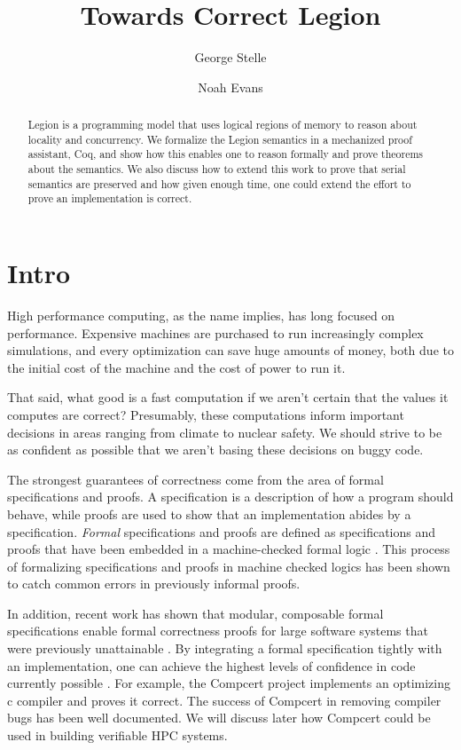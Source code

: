 \documentclass[sigplan]{acmart}
\begin{document}
\title{Towards Correct Legion}
\author{George Stelle}

\author{Noah Evans}

\begin{abstract}
Legion is a programming model that uses logical regions of memory to reason about 
locality and concurrency. We formalize the Legion semantics in a mechanized
proof assistant, Coq, and show how this enables one to reason formally and
prove theorems about the semantics. We also discuss how to extend this work to
prove that serial semantics are preserved and how given enough time, one could
extend the effort to prove an implementation is correct.
\end{abstract}

\maketitle

\section{Intro}
High performance computing, as the name implies, has long focused on
performance. Expensive machines are purchased to run increasingly complex
simulations, and every optimization can save huge amounts of money, both due to
the initial cost of the machine and the cost of power to run it. 

That said, what good is a fast computation if we aren't certain that the
values it computes are correct? Presumably, these computations inform important
decisions in areas ranging from climate to nuclear safety. We should strive to
be as confident as possible that we aren't basing these decisions on buggy
code.

The strongest guarantees of correctness come from the area of formal specifications 
and proofs. A specification is a description of how a program should behave, while proofs
are used to show that an implementation abides by a specification.
\emph{Formal} specifications and proofs are defined as specifications and
proofs that have been embedded in a machine-checked formal logic \cite{Coq,
isabelle...}. This process of formalizing specifications and proofs in machine
checked logics has been shown to catch common errors in previously informal proofs.

In addition, recent work has shown that modular, composable formal
specifications enable formal correctness proofs for large software systems that
were previously unattainable \cite{?}. By integrating a formal specification
tightly with an implementation, one can achieve the highest levels of
confidence in code currently possible \cite{?}. For example, the Compcert
project implements an optimizing c compiler and proves it correct. The success
of Compcert in removing compiler bugs has been well documented. We will discuss
later how Compcert could be used in building verifiable HPC systems.
\end{document}
